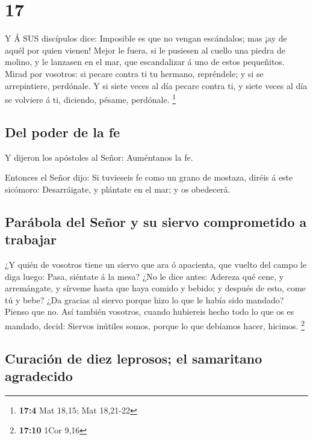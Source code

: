 \hypertarget{section-16}{%
\section{17}\label{section-16}}

 Y Á SUS discípulos dice: Imposible es que no vengan
escándalos; mas ¡ay de aquél por quien vienen!  Mejor le
fuera, si le pusiesen al cuello una piedra de molino, y le lanzasen en
el mar, que escandalizar á uno de estos pequeñitos.  Mirad
por vosotros: si pecare contra ti tu hermano, repréndele; y si se
arrepintiere, perdónale.  Y si siete veces al día pecare
contra ti, y siete veces al día se volviere á ti, diciendo, pésame,
perdónale. \footnote{\textbf{17:4} Mat 18,15; Mat 18,21-22}

\hypertarget{del-poder-de-la-fe}{%
\subsection{Del poder de la fe}\label{del-poder-de-la-fe}}

 Y dijeron los apóstoles al Señor: Auméntanos la fe.

 Entonces el Señor dijo: Si tuvieseis fe como un grano de
mostaza, diréis á este sicómoro: Desarráigate, y plántate en el mar; y
os obedecerá.

\hypertarget{paruxe1bola-del-seuxf1or-y-su-siervo-comprometido-a-trabajar}{%
\subsection{Parábola del Señor y su siervo comprometido a
trabajar}\label{paruxe1bola-del-seuxf1or-y-su-siervo-comprometido-a-trabajar}}

 ¿Y quién de vosotros tiene un siervo que ara ó apacienta,
que vuelto del campo le diga luego: Pasa, siéntate á la mesa?
 ¿No le dice antes: Adereza qué cene, y arremángate, y
sírveme hasta que haya comido y bebido; y después de esto, come tú y
bebe?  ¿Da gracias al siervo porque hizo lo que le había
sido mandado? Pienso que no.  Así también vosotros, cuando
hubiereis hecho todo lo que os es mandado, decid: Siervos inútiles
somos, porque lo que debíamos hacer, hicimos. \footnote{\textbf{17:10}
  1Cor 9,16}

\hypertarget{curaciuxf3n-de-diez-leprosos-el-samaritano-agradecido}{%
\subsection{Curación de diez leprosos; el samaritano
agradecido}\label{curaciuxf3n-de-diez-leprosos-el-samaritano-agradecido}}

